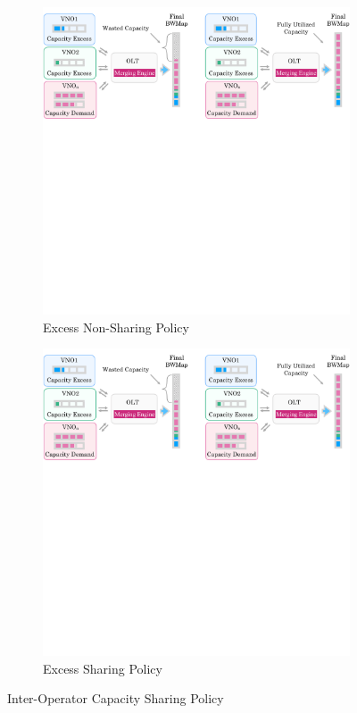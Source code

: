 \begin{figure}[h]
\centering
\begin{subfigure}{0.48\columnwidth}
 \includegraphics[width=\textwidth]{Figures/non-sharing.pdf}
\caption{Excess Non-Sharing Policy}%
\label{nonsharing_p}
\end{subfigure}\hfill%
\begin{subfigure}{0.48\columnwidth}
 \includegraphics[width=\textwidth]{Figures/sharing.pdf}
\caption{Excess Sharing Policy}%
\label{sharing_p}
\end{subfigure}\hfill%
\caption{Inter-Operator Capacity Sharing Policy}
\label{nonsharingvssharing_p}%
\end{figure}

